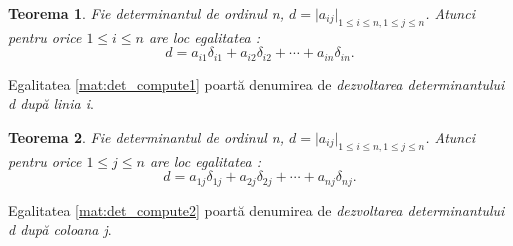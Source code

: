 \newtheorem{th_detcompute}{Teorema}
\begin{th_detcompute}
Fie determinantul de ordinul \textit{n}, $\mathit{d} = \vert a_{ij} 
\vert_{1 \leq i \leq n, 1 \leq j \leq n}$. Atunci pentru orice 
$1 \leq i \leq n$ are loc egalitatea :
\begin{equation}
\label{mat:det_compute1}
\mathit{d} = a_{i1}\delta_{i1} + a_{i2}\delta_{i2} + \cdots + a_{in}\delta_{in}.
\end{equation}
\end{th_detcompute}
Egalitatea \eqref{mat:det_compute1} poartă denumirea de \textit{dezvoltarea
determinantului d după linia i}.

\newtheorem{th_detcompute2}[th_detcompute]{Teorema}
\begin{th_detcompute2}
Fie determinantul de ordinul \textit{n}, $\mathit{d} = \vert a_{ij} 
\vert_{1 \leq i \leq n, 1 \leq j \leq n}$. Atunci pentru orice 
$1 \leq j \leq n$ are loc egalitatea :
\begin{equation}
\label{mat:det_compute2}
\mathit{d} = a_{1j}\delta_{1j} + a_{2j}\delta_{2j} + \cdots + a_{nj}\delta_{nj}.
\end{equation}
\end{th_detcompute2}
Egalitatea \eqref{mat:det_compute2} poartă denumirea de \textit{dezvoltarea
determinantului d după coloana j}.

